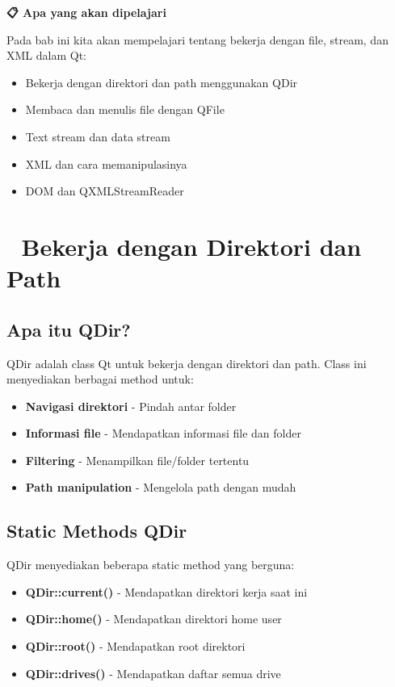 \textbf{📋 Apa yang akan dipelajari}

Pada bab ini kita akan mempelajari tentang bekerja dengan file, stream, dan XML dalam Qt:

\begin{itemize}
\item Bekerja dengan direktori dan path menggunakan QDir
\item Membaca dan menulis file dengan QFile
\item Text stream dan data stream
\item XML dan cara memanipulasinya
\item DOM dan QXMLStreamReader
\end{itemize}

\minitoc

\section{📁 Bekerja dengan Direktori dan Path}

\subsection{Apa itu QDir?}

QDir adalah class Qt untuk bekerja dengan direktori dan path. Class ini menyediakan berbagai method untuk:

\begin{itemize}
\item \textbf{Navigasi direktori} - Pindah antar folder
\item \textbf{Informasi file} - Mendapatkan informasi file dan folder
\item \textbf{Filtering} - Menampilkan file/folder tertentu
\item \textbf{Path manipulation} - Mengelola path dengan mudah
\end{itemize}

\subsection{Static Methods QDir}

QDir menyediakan beberapa static method yang berguna:

\begin{itemize}
\item \textbf{QDir::current()} - Mendapatkan direktori kerja saat ini
\item \textbf{QDir::home()} - Mendapatkan direktori home user
\item \textbf{QDir::root()} - Mendapatkan root direktori
\item \textbf{QDir::drives()} - Mendapatkan daftar semua drive
\end{itemize}

